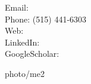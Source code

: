 \documentclass[letterpaper,11pt]{article}
\begin{document}


{
    Email:  \\
    Phone: (515) 441-6303\\
    Web:  \\ 
    LinkedIn:  \\
    GoogleScholar: 

}
{photo/me2}














\end{document}
